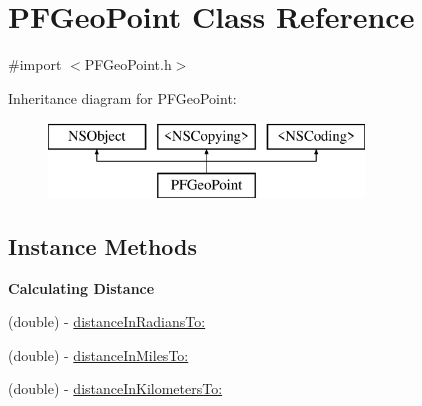 \hypertarget{interface_p_f_geo_point}{}\section{P\+F\+Geo\+Point Class Reference}
\label{interface_p_f_geo_point}


{\ttfamily \#import $<$P\+F\+Geo\+Point.\+h$>$}

Inheritance diagram for P\+F\+Geo\+Point\+:\begin{figure}[H]
\begin{center}
\leavevmode
\includegraphics[height=2.000000cm]{interface_p_f_geo_point}
\end{center}
\end{figure}
\subsection*{Instance Methods}
\begin{Indent}{\bf Calculating Distance}\par
{\em 

 

 }\begin{DoxyCompactItemize}
\item 
(double) -\/ \hyperlink{interface_p_f_geo_point_a717f3f4d87fc0ae914a19de0cd0a8ca8}{distance\+In\+Radians\+To\+:}
\item 
(double) -\/ \hyperlink{interface_p_f_geo_point_aa28aef632fb154123659182a77ad3263}{distance\+In\+Miles\+To\+:}
\item 
(double) -\/ \hyperlink{interface_p_f_geo_point_ae6c4a681352cd1295f2a7cefa38d4925}{distance\+In\+Kilometers\+To\+:}
\end{DoxyCompactItemize}
\end{Indent}
